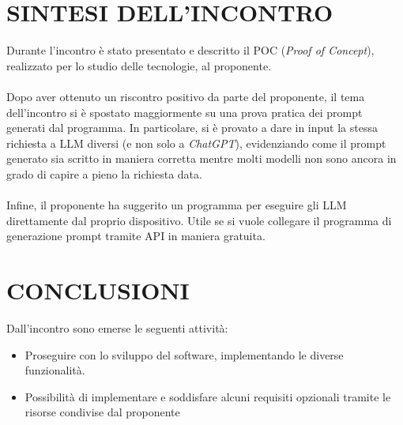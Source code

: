\documentclass[5pt]{article}
\begin{document}
\section{SINTESI DELL'INCONTRO}
Durante l'incontro è stato presentato e descritto il POC (\textit{Proof of Concept}), realizzato per lo studio delle tecnologie, al proponente.\\ \\
Dopo aver ottenuto un riscontro positivo da parte del proponente, il tema dell'incontro si è spostato maggiormente su una prova pratica dei prompt generati dal programma. In particolare, si è provato a dare in input la stessa richiesta a LLM diversi (e non solo a \textit{ChatGPT}), evidenziando come il prompt generato sia scritto in maniera corretta mentre molti modelli non sono ancora in grado di capire a pieno la richiesta data.\\ \\
Infine, il proponente ha suggerito un programma per eseguire gli LLM direttamente dal proprio dispositivo. Utile se si vuole collegare il programma di generazione prompt tramite API in maniera gratuita.

\section{CONCLUSIONI}
Dall'incontro sono emerse le seguenti attività: 
\begin{itemize}
    \item Proseguire con lo sviluppo del software, implementando le diverse funzionalità.
    \item Possibilità di implementare e soddisfare alcuni requisiti opzionali tramite le risorse condivise dal proponente
\end{itemize}
\end{document}
